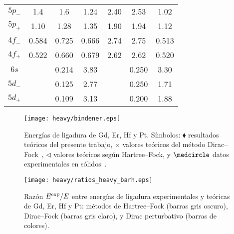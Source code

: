 \begin{longtable}{|c|ccc|ccc|}
$5p_-$ & 1.4    & 1.6    & 1.24  & 2.40   & 2.53   & 1.02 \\
$5p_+$ & 1.10   & 1.28   & 1.35  & 1.90   & 1.94   & 1.12 \\
$4f_-$ & 0.584  & 0.725  & 0.666 & 2.74   & 2.75   & 0.513 \\
$4f_+$ & 0.522  & 0.660  & 0.679 & 2.62   & 2.62   & 0.520 \\ 
$6s$   &        & 0.214  & 3.83  &        & 0.250  & 3.30 \\  
$5d_-$ &        & 0.125  & 2.77  &        & 0.250  & 1.71 \\  
$5d_+$ &        & 0.109  & 3.13  &        & 0.200  & 1.88 \\
\hline
\end{longtable}

\begin{figure}[H]
\centering
\texttt{[image: heavy/bindener.eps]}
\caption[Energías de ligadura de blancos relativistas]
{Energías de ligadura de Gd, Er, Hf y Pt. Símbolos: 
$\blacklozenge$ resultados teóricos del presente trabajo, 
$\times$ valores teóricos del método Dirac--Fock~\cite{Desclaux:73}, 
$\triangleleft$ valores teóricos según Hartree--Fock, y 
$\medcircle$ datos experimentales en sólidos~\cite{Williams:95}.}
\label{fig:bindener}
\end{figure}

\begin{figure}[t]
\centering
\texttt{[image: heavy/ratios\_heavy\_barh.eps]} 
\caption[Razón $E^{\mbox{\scriptsize exp}}/E$ entre energías de ligadura 
experimentales y teóricas.]
{Razón $E^{\mbox{\scriptsize exp}}/E$ entre energías de ligadura 
experimentales y teóricas de Gd, Er, Hf y Pt: métodos de Hartree--Fock 
(barras gris oscuro), Dirac--Fock (barras gris claro), y Dirac 
perturbativo (barras de colores).}
\label{fig:ratios}
\end{figure}

